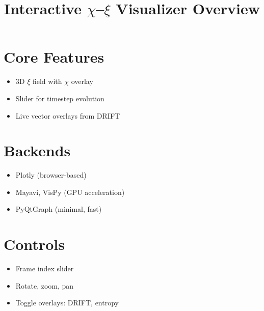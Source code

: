 \documentclass{article}
\title{Interactive $\chi$–$\xi$ Visualizer Overview}
\author{}
\date{}
\begin{document}
\maketitle

\section*{Core Features}

\begin{itemize}
  \item 3D $\xi$ field with $\chi$ overlay
  \item Slider for timestep evolution
  \item Live vector overlays from DRIFT
\end{itemize}

\section*{Backends}

\begin{itemize}
  \item Plotly (browser-based)
  \item Mayavi, VisPy (GPU acceleration)
  \item PyQtGraph (minimal, fast)
\end{itemize}

\section*{Controls}

\begin{itemize}
  \item Frame index slider
  \item Rotate, zoom, pan
  \item Toggle overlays: DRIFT, entropy
\end{itemize}
\end{document}
